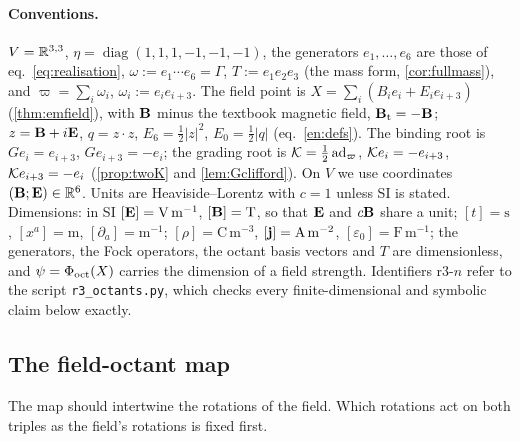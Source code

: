 \paragraph{Conventions.} $V=\mathbb{R}^{3,3}$, $\eta=\operatorname{diag}(1,1,1,\allowbreak-1,-1,-1)$, the generators $e_1,\dots,e_6$ are those of eq.~\cref{eq:realisation}, $\omega:=e_1\cdots e_6=\Gamma$, $T:=e_1e_2e_3$ (the mass form, \cref{cor:fullmass}), and $\varpi=\sum_i\omega_i$,
$\omega_i:=e_ie_{i+3}$. The field point is $X=\sum_i(B_ie_i+E_ie_{i+3})$ (\cref{thm:emfield}), with $\mathbf B$ minus the textbook magnetic
field, $\mathbf B_{\rm t}=-\mathbf B$; $z=\mathbf B+i\mathbf E$, $q=z\cdot z$, $E_6=\tfrac12|z|^2$, $E_0=\tfrac12|q|$ (eq.~\cref{en:defs}). The binding root is
$Ge_i=e_{i+3}$, $Ge_{i+3}=-e_i$; the grading root is $\mathcal K=\tfrac12\operatorname{ad}_{\varpi}$, $\mathcal K e_i=-e_{i+3}$, $\mathcal K e_{i+3}=-e_i$
(\cref{prop:twoK} and \cref{lem:Gclifford}). On $V$ we use coordinates
$(\mathbf B;\mathbf E)\in\mathbb{R}^6$. Units are Heaviside--Lorentz with $c=1$ unless SI is stated. Dimensions: in SI $[\mathbf E]=\mathrm{V\,m^{-1}}$,
$[\mathbf B]=\mathrm T$, so that $\mathbf E$ and $c\mathbf B$ share a unit; $[t]=\mathrm s$, $[x^a]=\mathrm m$, $[\partial_a]=\mathrm m^{-1}$; $[\rho]=\mathrm{C\,m^{-3}}$,
$[\mathbf j]=\mathrm{A\,m^{-2}}$, $[\varepsilon_0]=\mathrm{F\,m^{-1}}$; the generators, the Fock operators, the octant basis vectors and $T$ are
dimensionless, and $\psi=\Phi_{\rm oct}(X)$ carries the dimension of a field strength. Identifiers r3-$n$ refer to the script
\texttt{r3\_octants.py}, which checks every finite-dimensional and symbolic claim below exactly.

\subsection{The field-octant map}
\label{r3:sec:phi}

The map should intertwine the rotations of the field. Which rotations act on both triples as the field's rotations is fixed first.

